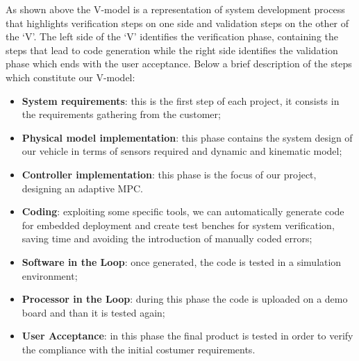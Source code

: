 As shown above the V-model is a representation of system development process that highlights verification steps on one side and validation steps on the other of the ‘V’. The left side of the ‘V’ identifies the verification phase, containing the steps that lead to code generation while the right side identifies the validation phase which ends with the user acceptance.
Below a brief description of the steps which constitute our V-model:
\begin{itemize}
    \item \textbf{System requirements}: this is the first step of each project, it consists in the requirements gathering from the customer;
    \item \textbf{Physical model implementation}: this phase contains the system design of our vehicle in terms of sensors required and dynamic and kinematic model;
    \item \textbf{Controller implementation}: this phase is the focus of our project, designing an adaptive MPC. 
    \item \textbf{Coding}: exploiting some specific tools, we can automatically generate code for embedded deployment and create test benches for system verification, saving time and avoiding the introduction of manually coded errors;
    \item \textbf{Software in the Loop}: once generated, the code is tested in a simulation environment;
    
    \item \textbf{Processor in the Loop}: during this phase the code is uploaded on a demo board and than it is tested again;
    
    \item \textbf{User Acceptance}: in this phase the final product is tested in order to verify the compliance with the initial costumer requirements.
\end{itemize}







